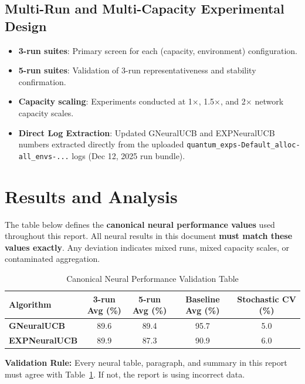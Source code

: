 \documentclass[12pt,a4paper]{article}
\newcommand{\legacy}[1]{\textcolor{legacycolor}{\textbf{#1}}}
\newcommand{\neural}[1]{\textcolor{neuralcolor}{\textbf{#1}}}
\begin{document}
\subsection{Multi-Run and Multi-Capacity Experimental Design}
\begin{itemize}
\item \textbf{3-run suites}: Primary screen for each (capacity, environment) configuration.
\item \textbf{5-run suites}: Validation of 3-run representativeness and stability confirmation.
\item \textbf{Capacity scaling}: Experiments conducted at 1$\times$, 1.5$\times$, and 2$\times$ network capacity scales.
\item \textbf{Direct Log Extraction}: Updated GNeuralUCB and EXPNeuralUCB numbers extracted directly from the uploaded \texttt{quantum\_exps-Default\_alloc-all\_envs-...} logs (Dec 12, 2025 run bundle).
\end{itemize}

\newpage
\section{Results and Analysis}
\begin{tcolorbox}[colback=highlightgray,
                  colframe=warningred,
                  title=\textbf{Neural Results Validation Checksum (Dec 12, 2025 Log Bundle)}]
\small

The table below defines the \textbf{canonical neural performance values}
used throughout this report.
All neural results in this document \textbf{must match these values exactly}.
Any deviation indicates mixed runs, mixed capacity scales,
or contaminated aggregation.

\begin{table}[H]
\centering
\caption{Canonical Neural Performance Validation Table}
\label{tab:neural-validation}
\begin{tabular}{|l|c|c|c|c|}
\hline
\textbf{Algorithm}
& \textbf{3-run Avg (\%)}
& \textbf{5-run Avg (\%)}
& \textbf{Baseline Avg (\%)}
& \textbf{Stochastic CV (\%)} \\
\hline
\hline
\neural{GNeuralUCB}
& 89.6
& 89.4
& 95.7
& 5.0 \\
\legacy{EXPNeuralUCB}
& 89.9
& 87.3
& 90.9
& 6.0 \\
\hline
\end{tabular}
\end{table}

\textbf{Validation Rule:}
Every neural table, paragraph, and summary in this report
must agree with Table~\ref{tab:neural-validation}.
If not, the report is using incorrect data.
\end{tcolorbox}
\end{document}

